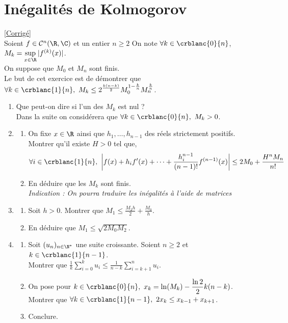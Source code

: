 \documentclass{book}
\begin{document}
	\section{Inégalités de Kolmogorov }
	\textcolor{blue}{\hyperref[Inégalités de Kolmogorov corrigé]{[Corrigé]}}\\
	\label{Inégalités de Kolmogorov}
	Soient $f\in \mathcal C^n(\R,\C)$ et un entier $n\geq2$ On note $\forall k \in\crblanc{0}{n}$, $M_k=\sup\limits_{x\in\R} |f^{(k)}(x)|$.\\
	On suppose que $M_0$ et $M_n$ sont finis.\\
	Le but de cet exercice est de démontrer que $\forall k\in \crblanc{1}{n},\ M_k \leq 2^{\frac{k(n-k)}{2}}M_0^{1-\frac{k}{n}}M_n^{\frac{k}{n}}$.\\
	\begin{enumerate}[leftmargin=*]
		\item Que peut-on dire si l'un des $M_k$ est nul ?\\
		Dans la suite on considérera que $\forall k\in \crblanc{0}{n},\ M_k>0$.
		\item
		\begin{enumerate}[label=\alph*.]
			\item On fixe $x\in \R$ ainsi que $h_1,\dots,h_{n-1}$ des réels strictement positifs. Montrer qu'il existe $H>0$ tel que,
			$$\forall i\in \crblanc{1}{n},\ \left|f(x)+h_if'(x)+\cdots+\frac{h_i^{n-1}}{(n-1)!}f^{(n-1)}(x)\right|\leq 2M_0+\frac{H^nM_n}{n!}$$
			\item En déduire que les $M_k$ sont finis.\\
			\textit{Indication : On pourra traduire les inégalités à l'aide de matrices}
		\end{enumerate}
		\item
		\begin{enumerate}[label=\alph*.]
			\item Soit $h>0$. Montrer que $M_1\leq \displaystyle\frac{M_2h}{2}+\frac{M_0}{h}$.
			\item En déduire que $M_1\leq \sqrt{2M_0M_2}$.
		\end{enumerate}
		\item
		\begin{enumerate}[label=\alph*.]
			\item Soit $(u_n)_{n\in \N^*}$ une suite croissante. Soient $n\geq 2$ et $k\in \crblanc{1}{n-1}$.\\
			Montrer que $\displaystyle\frac{1}{k}\sum_{i=0}^ku_i\leq \frac{1}{n-k}\sum_{i=k+1}^nu_i$.
			\item On pose pour $k\in \crblanc{0}{n},\ x_k=\displaystyle\ln(M_k)-\frac{\ln 2}{2}k(n-k)$.\\
			Montrer que $\forall k\in \crblanc{1}{n-1},\ 2x_k\leq x_{k-1}+x_{k+1}$.
			\item Conclure.
		\end{enumerate}
	\end{enumerate}
	
\end{document}
